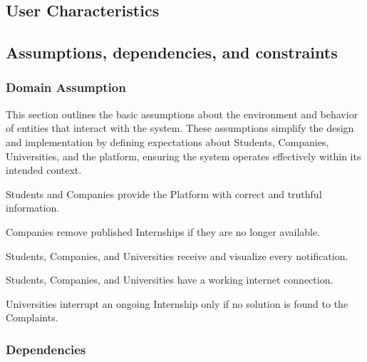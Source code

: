 \subsection{User Characteristics}


\subsection{Assumptions, dependencies, and constraints}

\subsubsection{Domain Assumption}
This section outlines the basic assumptions about the environment and behavior of entities that interact with the system. These assumptions simplify the design and implementation by defining expectations about Students, Companies, Universities, and the platform, ensuring the system operates effectively within its intended context.
\begin{enumerate}[label={\color{titleColor}[D\arabic*]}]
\item Students and Companies provide the Platform with correct and truthful information.
\item Companies remove published Internships if they are no longer available.
\item Students, Companies, and Universities receive and visualize every notification.
\item Students, Companies, and Universities have a working internet connection.
\item Universities interrupt an ongoing Internship only if no solution is found to the Complaints.
\end{enumerate}
\subsubsection{Dependencies}